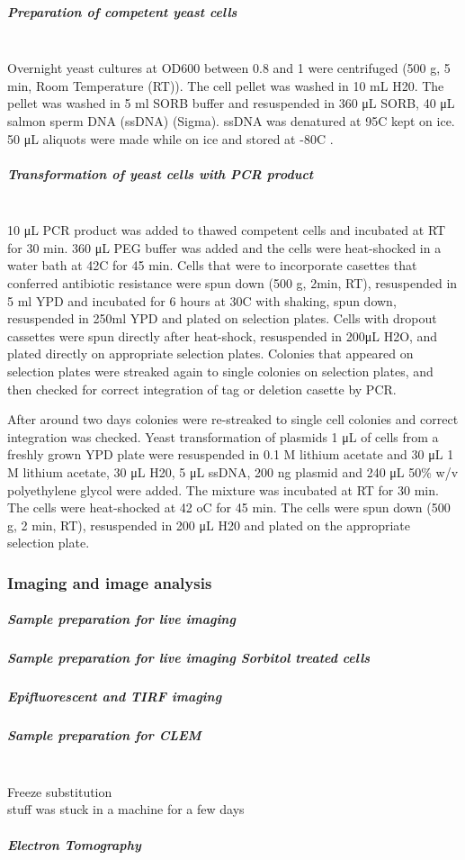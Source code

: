 \subparagraph{Preparation of competent yeast cells} 
\mbox{}\\
Overnight yeast cultures at OD600 between 0.8 and 1 were centrifuged (500 g, 5 min, Room Temperature (RT)). The cell
pellet was washed in 10 mL H20. The pellet was washed in 5 ml SORB buffer and resuspended in 360 μL SORB, 40 μL salmon sperm DNA (ssDNA) (Sigma). ssDNA was denatured at 95C kept on ice. 50 μL aliquots were made while on ice and stored at -80C .

\subparagraph{Transformation of yeast cells with PCR product} 
\mbox{}\\
10 μL PCR product was added to thawed competent cells and incubated at RT for 30 min. 360 μL PEG buffer was added and the cells were heat-shocked in a water bath at 42C for 45 min. Cells that were to incorporate casettes that conferred antibiotic resistance were spun down (500 g, 2min, RT), resuspended in 5 ml YPD and incubated for 6 hours at 30C with shaking, spun down, resuspended in 250ml YPD and plated on selection plates. Cells with dropout cassettes were spun directly after heat-shock, resuspended in 200μL H2O, and plated directly on appropriate selection plates. Colonies that appeared on selection plates were streaked again to single colonies on selection plates, and then checked for correct integration of tag or deletion casette by PCR.

After around two days colonies were re-streaked to single cell colonies and correct integration was checked.
Yeast transformation of plasmids
1 μL of cells from a freshly grown YPD plate were resuspended in 0.1 M lithium acetate and 30 μL 1 M lithium acetate, 30 μL H20, 5 μL ssDNA, 200 ng plasmid and 240 μL 50\% w/v polyethylene glycol were added. The mixture was incubated at RT for 30 min. The cells were heat-shocked at 42 oC for 45 min. The cells were spun down (500 g, 2 min, RT), resuspended in 200 μL H20 and plated on the appropriate selection plate.

\subsubsection{Imaging and image analysis }

\subparagraph{Sample preparation for live imaging}

\subparagraph{Sample preparation for live imaging Sorbitol treated cells}

\subparagraph{Epifluorescent and TIRF imaging}

\subparagraph{Sample preparation for CLEM}
			\mbox{}\\
\subsubitem
Freeze substitution
			\mbox{}\\
			stuff was stuck in a machine for a few days

\subparagraph{Electron Tomography}


